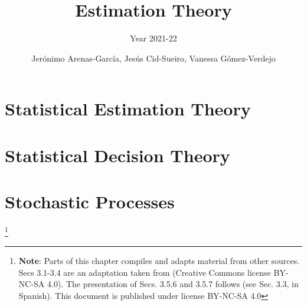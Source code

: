 \documentclass[graybox,envcountchap,sectrefs]{svmono_mod}
\begin{document}
\author{Jer\'onimo Arenas-Garc\'ia, Jes\'us Cid-Sueiro, Vanessa G\'omez-Verdejo}
\title{Estimation Theory}
\subtitle{Year 2021-22}

\maketitle

\frontmatter

\mainmatter %



\chapter{Statistical Estimation Theory}
\label{ch:ET}

\localtableofcontents









\chapter{Statistical Decision Theory}
\label{ch:SDT}

\localtableofcontents




\chapter{Stochastic Processes}

\footnote{\textbf{Note}: Parts of this chapter compiles and adapts material from other sources. Secs 3.1-3.4 are an adaptation taken from \cite{MITcourse} (Creative Commons license BY-NC-SA 4.0). The presentation of Secs. 3.5.6 and 3.5.7 follows \cite{ComDig2007} (see Sec. 3.3, in Spanish). This document is published under license BY-NC-SA 4.0}

\localtableofcontents

\end{document}
